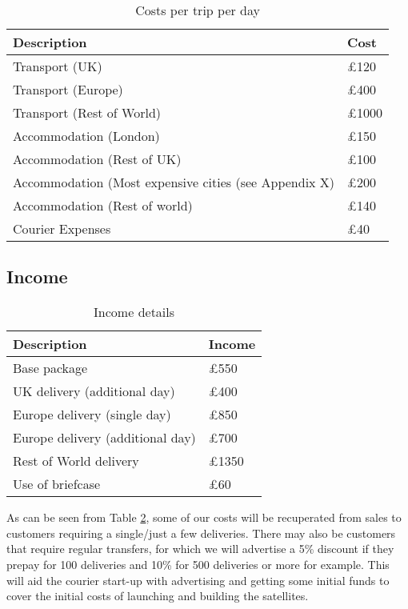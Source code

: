 \begin{table}[H]
    \centering
    \begin{tabular}{|p{}|p{}|}
        \hline
        \textbf{Description} & \textbf{Cost} \\
        \hline
        Transport (UK) & £120\\
        \hline
        Transport (Europe) & £400\\
        \hline
        Transport (Rest of World) & £1000 \\
        \hline
        Accommodation (London) & £150\\
        \hline
        Accommodation (Rest of UK) & £100\\
        \hline
        Accommodation (Most expensive cities (see Appendix X) & £200\\
        \hline
        Accommodation (Rest of world) & £140\\
        \hline
        Courier Expenses & £40\\
        \hline
    \end{tabular}
    \caption{Costs per trip per day}
    \label{tab:tripCosts}
\end{table}

\subsection{Income}

\begin{table}[H]
    \centering
    \begin{tabular}{|p{}|p{}|}
        \hline
        \textbf{Description} & \textbf{Income} \\
        \hline
        Base package & £550 \\
         \hline
        UK delivery (additional day) & £400 \\
        \hline
        Europe delivery (single day) & £850 \\
        \hline
        Europe delivery (additional day) & £700\\
        \hline
        Rest of World delivery & £1350\\
        \hline
        Use of briefcase & £60\\
        \hline
    \end{tabular}
    \caption{Income details}
    \label{tab:customerPricing}
\end{table}

As can be seen from Table \ref{tab:customerPricing}, some of our costs will be recuperated from sales to customers requiring a single/just a few deliveries. There may also be customers that require regular transfers, for which we will advertise a 5\% discount if they prepay for 100 deliveries and 10\% for 500 deliveries or more for example. This will aid the courier start-up with advertising and getting some initial funds to cover the initial costs of launching and building the satellites.

